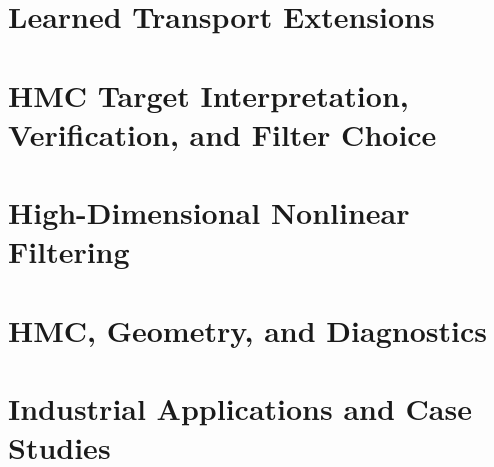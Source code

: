 \documentclass[12pt,a4paper,openany]{book}
\begin{document}
\part{Learned Transport Extensions}




\part{HMC Target Interpretation, Verification, and Filter Choice}




\part{High-Dimensional Nonlinear Filtering}









\part{HMC, Geometry, and Diagnostics}














\part{Industrial Applications and Case Studies}







\end{document}
